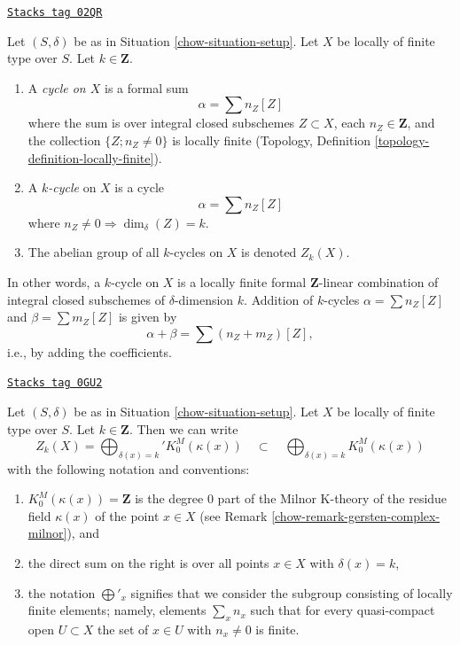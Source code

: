 \begin{definition}[Cycles]
\label{chow-definition-cycles}
\href{https://stacks.math.columbia.edu/tag/02QR}{\texttt{Stacks tag 02QR}}

Let $(S, \delta)$ be as in Situation \ref{chow-situation-setup}.
Let $X$ be locally of finite type over $S$.
Let $k \in \mathbf{Z}$.
\begin{enumerate}
\item A {\it cycle on $X$} is a formal sum
$$
\alpha = \sum n_Z [Z]
$$
where the sum is over integral closed subschemes $Z \subset X$,
each $n_Z \in \mathbf{Z}$, and the collection
$\{Z; n_Z \not = 0\}$ is locally finite
(Topology, Definition \ref{topology-definition-locally-finite}).
\item A {\it $k$-cycle} on $X$ is a cycle
$$
\alpha = \sum n_Z [Z]
$$
where $n_Z \not = 0 \Rightarrow \dim_\delta(Z) = k$.
\item The abelian group of all $k$-cycles on $X$ is denoted $Z_k(X)$.
\end{enumerate}
\end{definition}

In other words, a $k$-cycle on $X$
is a locally finite formal $\mathbf{Z}$-linear
combination of integral closed subschemes of $\delta$-dimension $k$.
Addition of $k$-cycles $\alpha = \sum n_Z[Z]$ and
$\beta = \sum m_Z[Z]$ is given by
$$
\alpha + \beta = \sum (n_Z + m_Z)[Z],
$$
i.e., by adding the coefficients.

\begin{remark}
\label{chow-remark-cycles-pointwise}
\href{https://stacks.math.columbia.edu/tag/0GU2}{\texttt{Stacks tag 0GU2}}

Let $(S, \delta)$ be as in Situation \ref{chow-situation-setup}.
Let $X$ be locally of finite type over $S$. Let $k \in \mathbf{Z}$.
Then we can write
$$
Z_k(X) = \bigoplus\nolimits_{\delta(x) = k}' K_0^M(\kappa(x))
\quad\subset\quad
\bigoplus\nolimits_{\delta(x) = k} K_0^M(\kappa(x))
$$
with the following notation and conventions:
\begin{enumerate}
\item $K_0^M(\kappa(x)) = \mathbf{Z}$ is the degree $0$ part of
the Milnor K-theory of the residue field $\kappa(x)$ of the point
$x \in X$ (see Remark \ref{chow-remark-gersten-complex-milnor}), and
\item the direct sum on the right is over all points $x \in X$
with $\delta(x) = k$,
\item the notation $\bigoplus'_x$ signifies that we consider the
subgroup consisting of locally finite elements; namely, elements
$\sum_x n_x$ such that for every quasi-compact open $U \subset X$
the set of $x \in U$ with $n_x \not = 0$ is finite.
\end{enumerate}
\end{remark}

